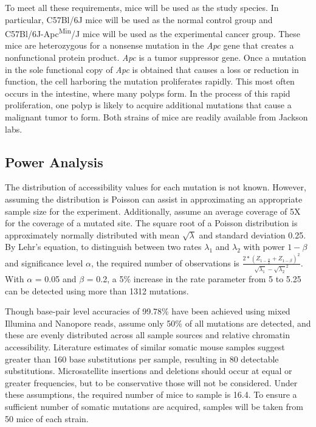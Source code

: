 To meet all these requirements, mice will be used as the study species. In particular, C57Bl/6J mice will be used as the normal control group and C57Bl/6J-Apc\textsuperscript{Min}/J mice will be used as the experimental cancer group. These mice are heterozygous for a nonsense mutation in the \textit{Apc} gene that creates a nonfunctional protein product. \textit{Apc} is a tumor suppressor gene. Once a mutation in the sole functional copy of \textit{Apc} is obtained that causes a loss or reduction in function, the cell harboring the mutation proliferates rapidly. This most often occurs in the intestine, where many polyps form. In the process of this rapid proliferation, one polyp is likely to acquire additional mutations that cause a malignant tumor to form. Both strains of mice are readily available from Jackson labs.

\subsection{Power Analysis}

The distribution of accessibility values for each mutation is not known. However, assuming the distribution is Poisson can assist in approximating an appropriate sample size for the experiment. Additionally, assume an average coverage of 5X for the coverage of a mutated site. The square root of a Poisson distribution is approximately normally distributed with mean $\sqrt{\lambda}$ and standard deviation 0.25.
By Lehr's equation, to distinguish between two rates $\lambda_1$ and $\lambda_2$ with power $1 - \beta$ and significance level $\alpha$, the required number of observations is $\frac{2 * (Z_{1 - \frac{\alpha}{2}} + Z_{1 - \beta})^2}{{\sqrt{\lambda_1} - \sqrt{\lambda_2}}^2}$. With $\alpha$ = 0.05 and $\beta$ = 0.2, a 5\% increase in the rate parameter from 5 to 5.25 can be detected using more than 1312 mutations.

Though base-pair level accuracies of 99.78\% have been achieved using mixed Illumina and Nanopore reads, assume only 50\% of all mutations are detected, and these are evenly distributed across all sample sources and relative chromatin accessibility. Literature estimates \parencite{behjati_genome_2014} of similar somatic mouse samples suggest greater than 160 base substitutions per sample, resulting in 80 detectable substitutions. Microsatellite insertions and deletions should occur at equal or greater frequencies, but to be conservative those will not be considered. Under these assumptions, the required number of mice to sample is 16.4. To ensure a sufficient number of somatic mutations are acquired, samples will be taken from 50 mice of each strain.


